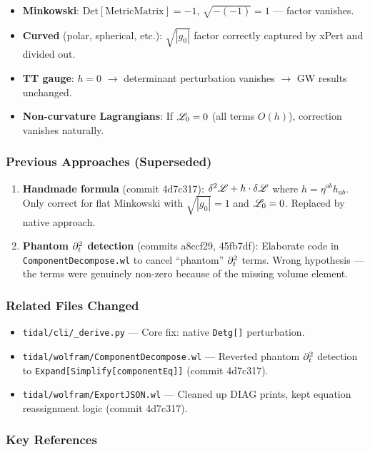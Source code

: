 \begin{itemize}
  \item \textbf{Minkowski}: $\text{Det}[\text{MetricMatrix}] = -1$, $\sqrt{-(-1)} = 1$ --- factor vanishes.
  \item \textbf{Curved} (polar, spherical, etc.): $\sqrt{|g_0|}$ factor correctly captured by xPert and divided out.
  \item \textbf{TT gauge}: $h = 0$ $\to$ determinant perturbation vanishes $\to$ GW results unchanged.
  \item \textbf{Non-curvature Lagrangians}: If $\mathscr{L}_0 = 0$ (all terms $O(h)$), correction vanishes naturally.
\end{itemize}

\subsubsection{Previous Approaches (Superseded)}

\begin{enumerate}
  \item \textbf{Handmade formula} (commit 4d7c317): $\delta^2 \mathscr{L} + h \cdot \delta\mathscr{L}$ where $h = \eta^{ab} h_{ab}$. Only correct for flat Minkowski with $\sqrt{|g_0|} = 1$ and $\mathscr{L}_0 = 0$. Replaced by native approach.
  \item \textbf{Phantom $\partial_t^2$ detection} (commits a8ccf29, 45fb7df): Elaborate code in \texttt{ComponentDecompose.wl} to cancel ``phantom'' $\partial_t^2$ terms. Wrong hypothesis --- the terms were genuinely non-zero because of the missing volume element.
\end{enumerate}

\subsubsection{Related Files Changed}

\begin{itemize}
  \item \texttt{tidal/cli/\_derive.py} --- Core fix: native \texttt{Detg[]} perturbation.
  \item \texttt{tidal/wolfram/ComponentDecompose.wl} --- Reverted phantom $\partial_t^2$ detection to \texttt{Expand[Simplify[componentEq]]} (commit 4d7c317).
  \item \texttt{tidal/wolfram/ExportJSON.wl} --- Cleaned up DIAG prints, kept equation reassignment logic (commit 4d7c317).
\end{itemize}

\subsubsection{Key References}

